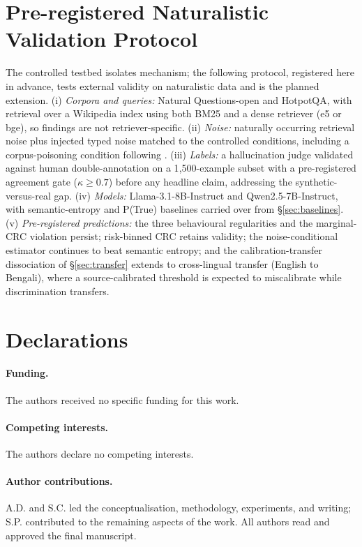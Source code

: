 \documentclass[11pt]{article}
\begin{document}
\section{Pre-registered Naturalistic Validation Protocol}
\label{app:prereg}
The controlled testbed isolates mechanism; the following protocol,
registered here in advance, tests external validity on naturalistic
data and is the planned extension. (i) \emph{Corpora and queries:}
Natural Questions-open and HotpotQA, with retrieval over a Wikipedia
index using both BM25 and a dense retriever (e5 or bge), so findings
are not retriever-specific. (ii) \emph{Noise:} naturally occurring
retrieval noise plus injected typed noise matched to the controlled
conditions, including a corpus-poisoning condition following
\citet{zou2025poisonedrag}. (iii) \emph{Labels:} a hallucination judge
validated against human double-annotation on a 1{,}500-example subset
with a pre-registered agreement gate ($\kappa \ge 0.7$) before any
headline claim, addressing the synthetic-versus-real gap. (iv) \emph{Models:}
Llama-3.1-8B-Instruct and Qwen2.5-7B-Instruct, with semantic-entropy and
P(True) baselines carried over from \S\ref{sec:baselines}.
(v) \emph{Pre-registered predictions:} the three behavioural
regularities and the marginal-CRC violation persist; risk-binned CRC
retains validity; the noise-conditional estimator continues to beat
semantic entropy; and the calibration-transfer dissociation of
\S\ref{sec:transfer} extends to cross-lingual transfer (English to
Bengali), where a source-calibrated threshold is expected to
miscalibrate while discrimination transfers.

\section*{Declarations}

\paragraph{Funding.} The authors received no specific funding for this work.

\paragraph{Competing interests.} The authors declare no competing interests.

\paragraph{Author contributions.} A.D. and S.C. led the
conceptualisation, methodology, experiments, and writing; S.P. contributed
to the remaining aspects of the work. All authors read and approved the
final manuscript.
\end{document}

